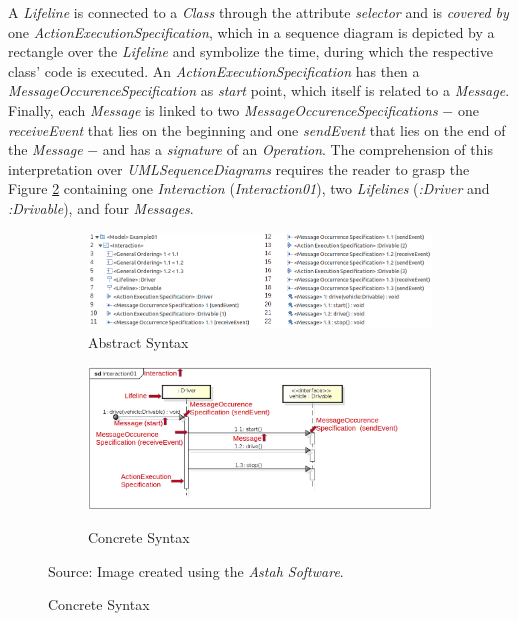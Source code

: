 \documentclass[tuberlin,cic,tc,english,noabntcite, oneside]{iiufrgs}
\begin{document}
A \emph{Lifeline} is connected to a \emph{Class} through the attribute \emph{selector} and is \emph{covered by} one \emph{ActionExecutionSpecification}, which in a sequence diagram is depicted by a rectangle over the \emph{Lifeline} and symbolize the time, during which the respective class' code is executed. An \emph{ActionExecutionSpecification} has then a \emph{MessageOccurenceSpecification} as \emph{start} point, which itself is related to a \emph{Message}. Finally, each \emph{Message} is linked to two \emph{MessageOccurenceSpecifications} $-$ one \emph{receiveEvent} that lies on the beginning and one \emph{sendEvent} that lies on the end of the \emph{Message} $-$ and has a \emph{signature} of an \emph{Operation}. The comprehension of this interpretation over \emph{UMLSequenceDiagrams} requires the reader to grasp the Figure \ref{fig:uml_metamodel_sequence_example} containing one \emph{Interaction} (\emph{Interaction01}), two \emph{Lifelines} (\emph{:Driver} and \emph{:Drivable}), and four \emph{Messages}.

\begin{figure}[H]
    \caption{An example of a model \emph{UMLSequenceDiagram} visualized in two different ways}
    \centering
   	\begin{subfigure}[h]{\textwidth}
   		\caption{Abstract Syntax}
   		\includegraphics[width=\textwidth]{umlSequenceDiagramExample01}
   	\end{subfigure}
   	\begin{subfigure}[h]{\textwidth}
   		\caption{Concrete Syntax}
   		\includegraphics[width=\textwidth]{umlSequenceDiagramExample01_Diagram}
   		\label{fig:uml_metamodel_sequence_example_diagram}
   	\end{subfigure}
    \label{fig:uml_metamodel_sequence_example}
    Source: Image created using the \emph{Astah Software}.
\end{figure}
\end{document}

